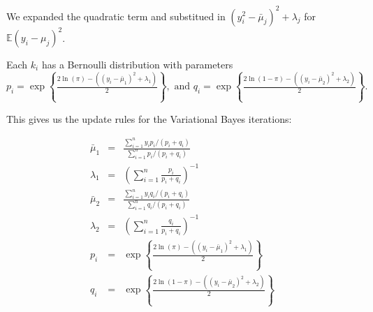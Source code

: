 \documentclass[12pt]{article}\usepackage[]{graphicx}\usepackage[]{color}
\begin{document}
We expanded the quadratic term and substitued in $(y_i^2 - \bar{\mu}_j)^2 + \lambda_j$ for $\mathbb{E} (y_i-\mu_j)^2$.

Each $k_i$ has a Bernoulli distribution with parameters $p_i = \exp \left\{\frac{2\ln(\pi)-((y_i - \bar{\mu}_1)^2 + \lambda_1)}{2} \right\}, \mbox{ and } q_i = \exp \left\{\frac{2\ln(1-\pi)-((y_i - \bar{\mu}_2)^2 + \lambda_2)}{2} \right\}.$

This gives us the update rules for the Variational Bayes iterations:

\begin{eqnarray*}
\bar{\mu}_1 & = &  \frac{\sum_{i=1}^{n} y_i p_i /(p_i+q_i)}{\sum_{i=1}^{n} p_i /(p_i+q_i)} \\
\lambda_1 & = & \left(\sum_{i=1}^{n} \frac{p_i}{p_i+q_i}\right)^{-1} \\
\bar{\mu}_2 & = &  \frac{\sum_{i=1}^{n} y_i q_i /(p_i+q_i)}{\sum_{i=1}^{n} q_i /(p_i+q_i)} \\
\lambda_2 & = & \left(\sum_{i=1}^{n} \frac{q_i}{p_i+q_i}\right)^{-1} \\
p_i & = & \exp \left\{\frac{2\ln(\pi)-((y_i - \bar{\mu}_1)^2 + \lambda_1)}{2} \right\} \\
q_i & = & \exp \left\{\frac{2\ln(1-\pi)-((y_i - \bar{\mu}_2)^2 + \lambda_2)}{2} \right\}
\end{eqnarray*}
\end{document}
